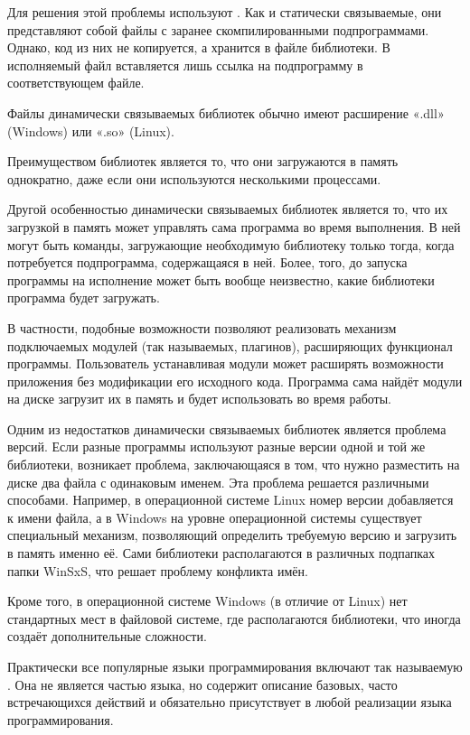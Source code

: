Для решения этой проблемы используют .  Как и статически
связываемые, они представляют собой файлы с заранее скомпилированными
подпрограммами. Однако, код из них не копируется, а хранится в файле
библиотеки. В исполняемый файл вставляется лишь ссылка на подпрограмму
в соответствующем файле.

Файлы динамически связываемых библиотек обычно имеют расширение «.dll»
(Windows) или «.so» (Linux).

Преимуществом библиотек является то, что они загружаются в память
однократно, даже если они используются несколькими процессами.

Другой особенностью динамически связываемых библиотек является то, что
их загрузкой в память может управлять сама программа во время
выполнения. В ней могут быть команды, загружающие необходимую
библиотеку только тогда, когда потребуется подпрограмма, содержащаяся
в ней.  Более, того, до запуска программы на исполнение может быть
вообще неизвестно, какие библиотеки программа будет загружать.

В частности, подобные возможности позволяют реализовать механизм
подключаемых модулей (так называемых, плагинов), расширяющих
функционал программы.  Пользователь устанавливая модули может
расширять возможности приложения без модификации его исходного
кода. Программа сама найдёт модули на диске загрузит их в память и
будет использовать во время работы.

Одним из недостатков динамически связываемых библиотек является
проблема версий. Если разные программы используют разные версии одной
и той же библиотеки, возникает проблема, заключающаяся в том, что
нужно разместить на диске два файла с одинаковым именем. Эта проблема
решается различными способами. Например, в операционной системе Linux
номер версии добавляется к имени файла, а в Windows на уровне
операционной системы существует специальный механизм, позволяющий
определить требуемую версию и загрузить в память именно её. Сами
библиотеки располагаются в различных подпапках папки WinSxS, что
решает проблему конфликта имён.

Кроме того, в операционной системе Windows (в отличие от Linux) нет
стандартных мест в файловой системе, где располагаются библиотеки, что
иногда создаёт дополнительные сложности. %

Практически все популярные языки программирования включают так
называемую . Она
не является частью языка, но содержит описание базовых, часто
встречающихся действий и обязательно присутствует в любой реализации
языка программирования.

